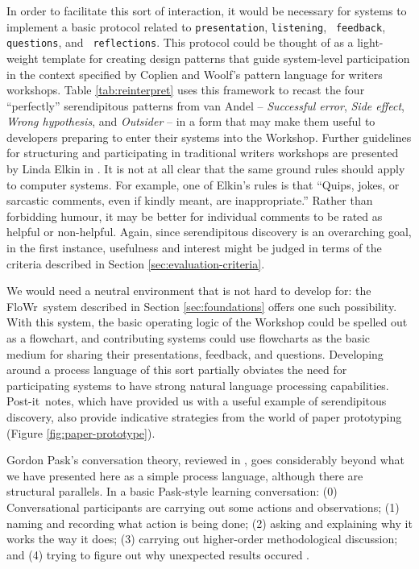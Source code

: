 \documentclass[letter]{article}
\newcommand{\Fw}{{\sf FloWr}}
\begin{document}
In order to facilitate this sort of interaction, it would be necessary
for systems to implement a basic protocol related to
{\tt presentation}, {\tt listening}, {\tt
  feedback}, {\tt questions}, and {\tt
  reflections}.
This protocol could be thought of as a light-weight template for
creating design patterns that guide system-level participation in the
context specified by Coplien and Woolf's pattern language for writers
workshops.  Table \ref{tab:reinterpret} uses this framework to recast
the four ``perfectly'' serendipitous patterns from van Andel --
\emph{Successful error}, \emph{Side effect}, \emph{Wrong hypothesis},
and \emph{Outsider} -- in a form that may make them useful to
developers preparing to enter their systems into the Workshop.
%
Further guidelines for structuring and participating in traditional
writers workshops are presented by Linda Elkin in
\cite[pp. 201-203]{gabriel2002writer}.  It is not at all clear that
the same ground rules should apply to computer systems.  For example,
one of Elkin's rules is that ``Quips, jokes, or sarcastic comments,
even if kindly meant, are inappropriate.''  Rather than forbidding
humour, it may be better for individual comments to be rated as
helpful or non-helpful.  Again, since serendipitous discovery is an
overarching goal, in the first instance, usefulness and interest might
be judged in terms of the criteria described in Section
\ref{sec:evaluation-criteria}.

We would need a neutral environment that is not hard to develop for:
the \Fw\ system described in Section \ref{sec:foundations}
offers one such possibility.  With this system, the basic operating
logic of the Workshop could be spelled out as a flowchart, and
contributing systems could use flowcharts as the basic medium for
sharing their presentations, feedback, and questions.  Developing
around a process language of this sort partially obviates the need for
participating systems to have strong natural language processing
capabilities.  
%
Post-it\texttrademark\ notes, which have provided us with a useful
example of serendipitous discovery, also provide indicative strategies
from the world of paper prototyping (Figure \ref{fig:paper-prototype}).

Gordon Pask's conversation theory, reviewed in
\cite{conversation-theory-review,boyd2004conversation}, goes
considerably beyond what we have presented here as a simple process
language, although there are structural parallels.  In a basic
Pask-style learning conversation: (0) Conversational participants are
carrying out some actions and observations; (1) naming and recording
what action is being done; (2) asking and explaining why it works the
way it does; (3) carrying out higher-order methodological discussion;
and (4) trying to figure out why unexpected results occured \cite[p. 190]{boyd2004conversation}.
\end{document}

